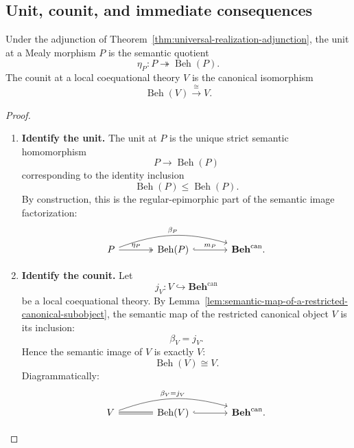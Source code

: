 \subsection{Unit, counit, and immediate consequences}
\label{subsec:universal-realization-consequences}

\begin{proposition}
\label{prop:universal-realization-unit-counit}
    Under the adjunction of
    Theorem~\ref{thm:universal-realization-adjunction}, the unit at a Mealy
    morphism \(P\) is the semantic quotient
    \[
        \eta_P:
        P\twoheadrightarrow
        \operatorname{Beh}(P).
    \]
    The counit at a local coequational theory \(V\) is the canonical
    isomorphism
    \[
        \operatorname{Beh}(V)
        \xrightarrow{\cong}
        V.
    \]
\end{proposition}

\begin{proof}
    \leavevmode
    \begin{enumerate}
        \item \textbf{Identify the unit.}
        The unit at \(P\) is the unique strict semantic homomorphism
        \[
            P\to\operatorname{Beh}(P)
        \]
        corresponding to the identity inclusion
        \[
            \operatorname{Beh}(P)\leq\operatorname{Beh}(P).
        \]
        By construction, this is the regular-epimorphic part of the semantic
        image factorization:
        \[
        \begin{tikzcd}[column sep=large, row sep=large]
            P
                \arrow[r, two heads, "\eta_P"]
                \arrow[rr, bend left=18, "\beta_P"]
            &
            \operatorname{Beh}(P)
                \arrow[r, hook, "m_P"]
            &
            \mathbf{Beh}^{\mathrm{can}} .
        \end{tikzcd}
        \]

        \item \textbf{Identify the counit.}
        Let
        \[
            j_V:V\hookrightarrow\mathbf{Beh}^{\mathrm{can}}
        \]
        be a local coequational theory. By
        Lemma~\ref{lem:semantic-map-of-a-restricted-canonical-subobject}, the
        semantic map of the restricted canonical object \(V\) is its inclusion:
        \[
            \beta_V=j_V.
        \]
        Hence the semantic image of \(V\) is exactly \(V\):
        \[
            \operatorname{Beh}(V)\cong V.
        \]
        Diagrammatically:
        \[
        \begin{tikzcd}[column sep=large, row sep=large]
            V
                \arrow[r, equal]
                \arrow[rr, bend left=18, "\beta_V=j_V"]
            &
            \operatorname{Beh}(V)
                \arrow[r, hook]
            &
            \mathbf{Beh}^{\mathrm{can}} .
        \end{tikzcd}
        \]
    \end{enumerate}
\end{proof}

